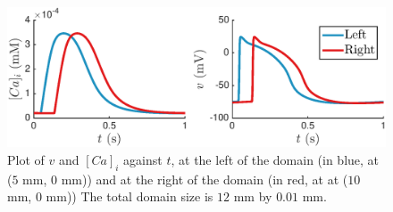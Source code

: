 \documentclass[12pt,a4paper]{article}
\begin{document}
%
\begin{figure}
   \includegraphics[width=1\linewidth]{strip} 
    \caption{Plot of $v$ and $[Ca]_i$ against $t$, at the left of the domain (in blue, at ($5$ mm, $0$ mm)) and at the right of the domain (in red, at at ($10$ mm, $0$ mm)) The total domain size is $12$ mm by $0.01$ mm.}
    \label{fig:3}
\end{figure}
%
\end{document}

